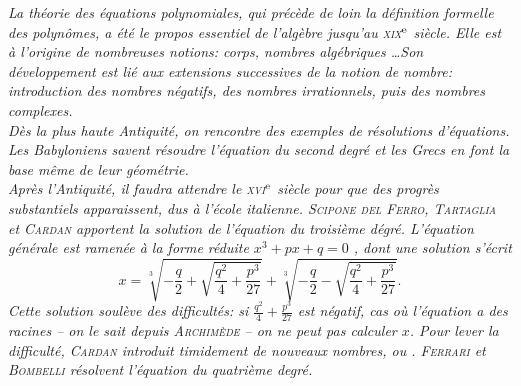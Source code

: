 \textsl{
La théorie des équations polynomiales, qui précède de loin la définition formelle des polynômes, a été le propos essentiel de l'algèbre jusqu'au \textsc{xix}$^{\mathrm{e}}$ siècle. Elle est à l'origine de nombreuses notions: corps, nombres algébriques \dots Son développement est lié aux extensions successives de la notion de nombre: introduction des nombres négatifs, des nombres irrationnels, puis des nombres complexes. \\ 
Dès la plus haute Antiquité, on rencontre des exemples de résolutions d'équations. Les Babyloniens savent résoudre l'équation du second degré et les Grecs en font la base même de leur géométrie. \\
Après l'Antiquité, il faudra attendre le \textsc{xvi}$^{\mathrm{e}}$ siècle pour que des progrès substantiels apparaissent, dus à l'école italienne. \textsc{Scipone del Ferro}, \textsc{Tartaglia} et \textsc{Cardan} apportent la solution de l'équation du troisième dégré. L'équation générale est ramenée à la forme réduite $x^3 + px + q = 0$ \note, dont une solution s'écrit
$$x = \sqrt[3]{-\frac{q}{2} + \sqrt{\frac{q^2}{4} + \frac{p^3}{27}}} + \sqrt[3]{-\frac{q}{2} - \sqrt{\frac{q^2}{4} + \frac{p^3}{27}}}.$$
Cette solution soulève des difficultés: si $\frac{q^2}{4} + \frac{p^3}{27}$ est négatif, cas où l'équation a des racines -- on le sait depuis \textsc{Archimède} -- on ne peut pas calculer $x$. Pour lever la difficulté, \textsc{Cardan} introduit timidement de nouveaux nombres,  ou . \textsc{Ferrari} et \textsc{Bombelli} résolvent l'équation du quatrième degré. \\
}
